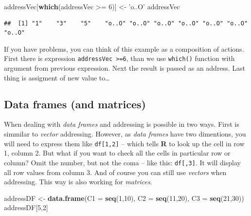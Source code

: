 \documentclass[]{book}
\newenvironment{Shaded}{\begin{snugshade}}{\end{snugshade}}
\newcommand{\KeywordTok}[1]{\textcolor[rgb]{0.12,0.11,0.11}{\textbf{#1}}}
\newcommand{\DataTypeTok}[1]{\textcolor[rgb]{0.00,0.34,0.68}{#1}}
\newcommand{\DecValTok}[1]{\textcolor[rgb]{0.69,0.50,0.00}{#1}}
\newcommand{\StringTok}[1]{\textcolor[rgb]{0.75,0.01,0.01}{#1}}
\newcommand{\OperatorTok}[1]{\textcolor[rgb]{0.12,0.11,0.11}{#1}}
\newcommand{\NormalTok}[1]{\textcolor[rgb]{0.12,0.11,0.11}{#1}}
\theoremstyle{definition}
\theoremstyle{definition}
\theoremstyle{definition}
\theoremstyle{remark}
\begin{document}
\begin{Shaded}
\begin{Highlighting}[]
\NormalTok{addressVec[}\KeywordTok{which}\NormalTok{(addressVec }\OperatorTok{>=}\StringTok{ }\DecValTok{6}\NormalTok{)] <-}\StringTok{ 'o..O'}
\NormalTok{addressVec}
\end{Highlighting}
\end{Shaded}

\begin{verbatim}
##  [1] "1"    "3"    "5"    "o..O" "o..O" "o..O" "o..O" "o..O" "o..O" "o..O"
\end{verbatim}

If you have problems, you can think of this example as a composition of
actions. First there is expression
\texttt{addressVec\ \textgreater{}=6}, than we use \texttt{which()}
function with argument from previous expression. Next the result is
passed as an address. Last thing is assigment of new value to\ldots{}

\subsection{Data frames (and matrices)}\label{data-frames-and-matrices}

When dealing with \emph{data frames} and addressing is possible in two
ways. First is simmilar to \emph{vector} addressing. However, as
\emph{data frames} have two dimentions, you will need to express them
like \texttt{df{[}1,2{]}} -- which tells \textbf{R} to look up the cell
in row 1, column 2. But what if you want to check all the cells in
particular row or column? Omit the number, but not the coma -- like
this: \texttt{df{[},3{]}}. It will display all row values from column 3.
And of course you can still use \emph{vectors} when addressing. This way
is also working for \emph{matrices}.

\begin{Shaded}
\begin{Highlighting}[]
\NormalTok{addressDF <-}\StringTok{ }\KeywordTok{data.frame}\NormalTok{(}\DataTypeTok{C1 =} \KeywordTok{seq}\NormalTok{(}\DecValTok{1}\NormalTok{,}\DecValTok{10}\NormalTok{), }\DataTypeTok{C2 =} \KeywordTok{seq}\NormalTok{(}\DecValTok{11}\NormalTok{,}\DecValTok{20}\NormalTok{), }\DataTypeTok{C3 =} \KeywordTok{seq}\NormalTok{(}\DecValTok{21}\NormalTok{,}\DecValTok{30}\NormalTok{))}
\NormalTok{addressDF[}\DecValTok{5}\NormalTok{,}\DecValTok{2}\NormalTok{]}
\end{Highlighting}
\end{Shaded}
\end{document}
